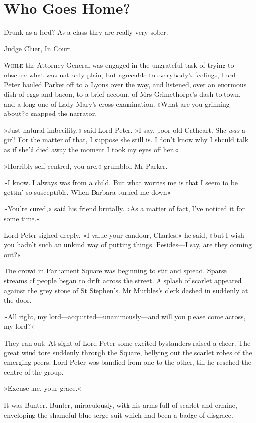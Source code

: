 
\chapter{Who Goes Home?}

\epigraph{Drunk as a lord? As a class they are really very sober.}{Judge Cluer, In Court}


\lettrine[lines=4]{W}{hile} the Attorney-General was engaged in the ungrateful task of trying to obscure what was not only plain, but agreeable to everybody's feelings, Lord Peter hauled Parker off to a Lyons over the way, and listened, over an enormous dish of eggs and bacon, to a brief account of Mrs Grimethorpe's dash to town, and a long one of Lady Mary's cross-examination.
»What are you grinning about?« snapped the narrator.

»Just natural imbecility,« said Lord Peter. »I say, poor old Cathcart.  She \textit{was} a girl! For the matter of that, I suppose she still is. I don't know why I should talk as if she'd died away the moment I took my eyes off her.«

»Horribly self-centred, you are,« grumbled Mr Parker.

»I know. I always was from a child. But what worries me is that I seem to be gettin' so susceptible. When Barbara turned me down\longdash«

»You're cured,« said his friend brutally. »As a matter of fact, I've noticed it for some time.«

Lord Peter sighed deeply. »I value your candour, Charles,« he said, »but I wish you hadn't such an unkind way of putting things. Besides—I say, are they coming out?«

The crowd in Parliament Square was beginning to stir and spread. Sparse streams of people began to drift across the street. A splash of scarlet appeared against the grey stone of St Stephen's. Mr Murbles's clerk dashed in suddenly at the door.

»All right, my lord—acquitted—unanimously—and will you please come across, my lord?«

They ran out. At sight of Lord Peter some excited bystanders raised a cheer. The great wind tore suddenly through the Square, bellying out the scarlet robes of the emerging peers. Lord Peter was bandied from one to the other, till he reached the centre of the group.

»Excuse me, your grace.«

It was Bunter. Bunter, miraculously, with his arms full of scarlet and ermine, enveloping the shameful blue serge suit which had been a badge of disgrace.


